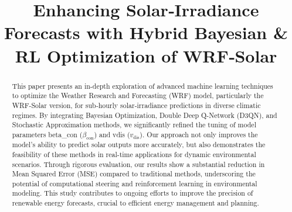 \documentclass[conference]{IEEEtran}
\begin{document}
\title{Enhancing Solar‑Irradiance Forecasts with Hybrid Bayesian \& RL Optimization of WRF‑Solar\\
}

\author{
\and
{}
\and
{}
\and
{}
}

\maketitle

\begin{abstract}
This paper presents an in-depth exploration of advanced machine learning techniques to optimize the Weather Research and Forecasting (WRF) model, particularly the WRF-Solar version, for sub‑hourly solar‑irradiance predictions in diverse climatic regimes. By integrating Bayesian Optimization, Double Deep Q-Network (D3QN), and Stochastic Approximation methods, we significantly refined the tuning of model parameters beta\_con (\(\beta_{\text{con}}\)) and vdis (\(v_{\text{dis}}\)). Our approach not only improves the model’s ability to predict solar outputs more accurately, but also demonstrates the feasibility of these methods in real-time applications for dynamic environmental scenarios. Through rigorous evaluation, our results show a substantial reduction in Mean Squared Error (MSE) compared to traditional methods, underscoring the potential of computational steering and reinforcement learning in environmental modeling. This study contributes to ongoing efforts to improve the precision of renewable energy forecasts, crucial to efficient energy management and planning. 
\end{abstract}
\end{document}
